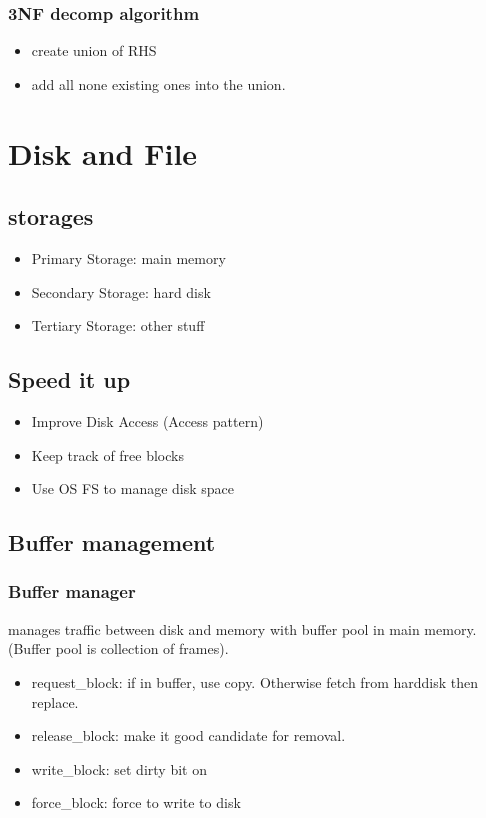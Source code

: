 \documentclass[a4paper]{scrartcl}
\begin{document}
    \subsubsection{3NF decomp algorithm}
      \begin{itemize}
        \item create union of RHS
        \item add all none existing ones into the union.
      \end{itemize}
\section{Disk and File}
  \subsection{storages}
    \begin{itemize}
      \item Primary Storage: main memory
      \item Secondary Storage: hard disk
      \item Tertiary Storage: other stuff
    \end{itemize}
  \subsection{Speed it up}
    \begin{itemize}
      \item Improve Disk Access (Access pattern)
      \item Keep track of free blocks
      \item Use OS FS to manage disk space
    \end{itemize}
  \subsection{Buffer management}
    \subsubsection{Buffer manager}
      manages traffic between disk and memory with buffer pool in main memory. (Buffer pool is collection of frames).
      \begin{itemize}
        \item request\_block: if in buffer, use copy. Otherwise fetch from harddisk then replace.
        \item release\_block: make it good candidate for removal.
        \item write\_block: set dirty bit on
        \item force\_block: force to write to disk
      \end{itemize}
\end{document}

